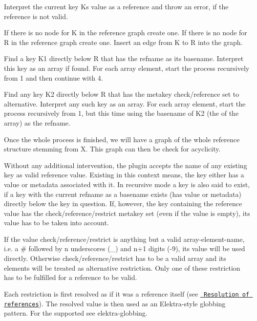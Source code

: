 \begin{DoxyEnumerate}
\item Interpret the current key {\ttfamily K}s value as a reference and throw an error, if the reference is not valid.
\item If there is no node for {\ttfamily K} in the reference graph create one. If there is no node for {\ttfamily R} in the reference graph create one. Insert an edge from {\ttfamily K} to {\ttfamily R} into the graph.
\item Find a key {\ttfamily K1} directly below {\ttfamily R} that has the {\ttfamily refname} as its basename. Interpret this key as an array if found. For each array element, start the process recursively from 1 and then continue with 4.
\item Find any key {\ttfamily K2} directly below {\ttfamily R} that has the metakey {\ttfamily check/reference} set to {\ttfamily alternative}. Interpret any such key as an array. For each array element, start the process recursively from 1, but this time using the basename of {\ttfamily K2} (the of the array) as the {\ttfamily refname}.
\end{DoxyEnumerate}

Once the whole process is finished, we will have a graph of the whole reference structure stemming from {\ttfamily X}. This graph can then be check for acyclicity.

Without any additional intervention, the plugin accepts the name of any existing key as valid reference value. Existing in this context means, the key either has a value or metadata associated with it. In recursive mode a key is also said to exist, if a key with the current {\ttfamily refname} as a basename exists (has value or metadata) directly below the key in question. If, however, the key containing the reference value has the {\ttfamily check/reference/restrict} metakey set (even if the value is empty), its value has to be taken into account.

If the value {\ttfamily check/reference/restrict} is anything but a valid array-\/element-\/name, i.\+e. a {\ttfamily \#} followed by {\ttfamily n} underscores ({\ttfamily \+\_\+}) and {\ttfamily n+1} digits ({-\/9}), its value will be used directly. Otherwise {\ttfamily check/reference/restrict} has to be a valid array and its elements will be treated as alternative restriction. Only one of these restriction has to be fulfilled for a reference to be valid.

Each restriction is first resolved as if it was a reference itself (see \href{\#resolution-of-references}{\texttt{ Resolution of references}}). The resolved value is then used as an Elektra-\/style globbing pattern. For the supported see elektra-\/globbing.

